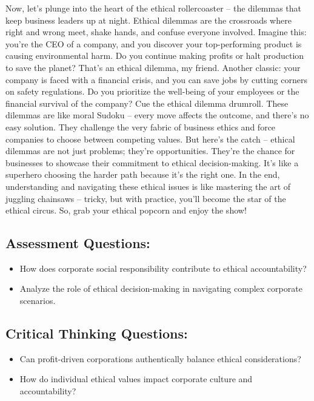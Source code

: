 \documentclass[
  letterpaper,
  DIV=11,
  numbers=noendperiod]{scrreprt}
\begin{document}
Now, let's plunge into the heart of the ethical rollercoaster -- the
dilemmas that keep business leaders up at night. Ethical dilemmas are
the crossroads where right and wrong meet, shake hands, and confuse
everyone involved. Imagine this: you're the CEO of a company, and you
discover your top-performing product is causing environmental harm. Do
you continue making profits or halt production to save the planet?
That's an ethical dilemma, my friend. Another classic: your company is
faced with a financial crisis, and you can save jobs by cutting corners
on safety regulations. Do you prioritize the well-being of your
employees or the financial survival of the company? Cue the ethical
dilemma drumroll. These dilemmas are like moral Sudoku -- every move
affects the outcome, and there's no easy solution. They challenge the
very fabric of business ethics and force companies to choose between
competing values. But here's the catch -- ethical dilemmas are not just
problems; they're opportunities. They're the chance for businesses to
showcase their commitment to ethical decision-making. It's like a
superhero choosing the harder path because it's the right one. In the
end, understanding and navigating these ethical issues is like mastering
the art of juggling chainsaws -- tricky, but with practice, you'll
become the star of the ethical circus. So, grab your ethical popcorn and
enjoy the show!

\subsection{Assessment Questions:}\label{assessment-questions-2}

\begin{itemize}
\item
  How does corporate social responsibility contribute to ethical
  accountability?
\item
  Analyze the role of ethical decision-making in navigating complex
  corporate scenarios.
\end{itemize}

\subsection{Critical Thinking
Questions:}\label{critical-thinking-questions-2}

\begin{itemize}
\item
  Can profit-driven corporations authentically balance ethical
  considerations?
\item
  How do individual ethical values impact corporate culture and
  accountability?
\end{itemize}
\end{document}
